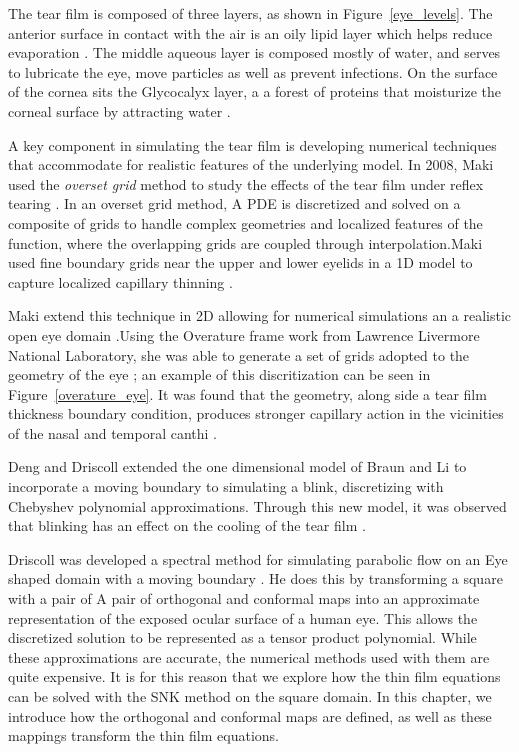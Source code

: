 	The tear film is composed of three layers, as shown in Figure~\ref{eye_levels}. The anterior surface in contact with the air is an oily lipid layer which helps reduce evaporation \cite{norn1979semiquantitative,mishima1961oily}. The middle aqueous layer is composed mostly of water, and serves to lubricate the eye, move particles as well as prevent infections. On the surface of the cornea sits the Glycocalyx layer, a a forest of proteins that moisturize the corneal surface by attracting water \cite{gipson2004distribution}. 
	
	A key component in simulating the tear film is developing numerical techniques that accommodate for realistic features of the underlying model. In 2008, Maki used the \textit{overset grid} method to study the effects of the tear film under reflex tearing \cite{maki2008overset}. In an overset grid method, A PDE is discretized and solved on a composite of grids to handle complex geometries and localized features of the function, where the overlapping grids are coupled through interpolation.Maki used fine boundary grids near the upper and lower eyelids in a 1D model to capture localized capillary thinning \cite{maki2008overset}.
	
	Maki extend this technique in 2D allowing for numerical simulations an a realistic open eye domain \cite{maki2010tear,maki2010tear2}.Using the Overature frame work from Lawrence Livermore National Laboratory, she was able to generate a set of grids adopted to the geometry of the eye \cite{chesshire1990composite}; an example of this discritization can be seen in Figure~\ref{overature_eye}. It was found that the geometry, along side a tear film thickness boundary condition, produces stronger capillary action in the vicinities of the nasal and temporal canthi \cite{maki2010tear}.

Deng and Driscoll extended the one dimensional model of Braun and Li \cite{li2012model} to incorporate a moving boundary to simulating a blink, discretizing with Chebyshev polynomial approximations. Through this new model, it was observed that blinking has an effect on the cooling of the tear film \cite{deng2013model,deng2014heat}. 

Driscoll was developed a spectral method for simulating parabolic flow on an Eye shaped domain with a moving boundary \cite{driscoll2018simulation}. He does this by transforming a square with a pair of A pair of orthogonal and conformal maps into an approximate representation of the exposed ocular surface of a human eye. This allows the discretized solution to be represented as a tensor product polynomial. While these approximations are accurate, the numerical methods used with them are quite expensive. It is for this reason that we explore how the thin film equations can be solved with the SNK method on the square domain. In this chapter, we introduce how the orthogonal and conformal maps are defined, as well as these mappings transform the thin film equations.



